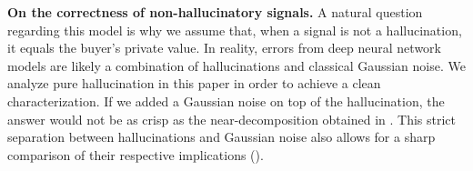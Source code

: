 \noindent \textbf{On the correctness of non-hallucinatory signals.}
A natural question regarding this model is why we assume that, when a signal is not a hallucination, it equals the buyer's private value. In reality, errors from deep neural network models are likely a combination of hallucinations and classical Gaussian noise. We analyze pure hallucination in this paper in order to achieve a clean characterization. If we added a Gaussian noise on top of the hallucination, the answer would not be as crisp as the near-decomposition obtained in . This strict separation between hallucinations and Gaussian noise also allows for a sharp comparison of their respective implications ().
 
 
